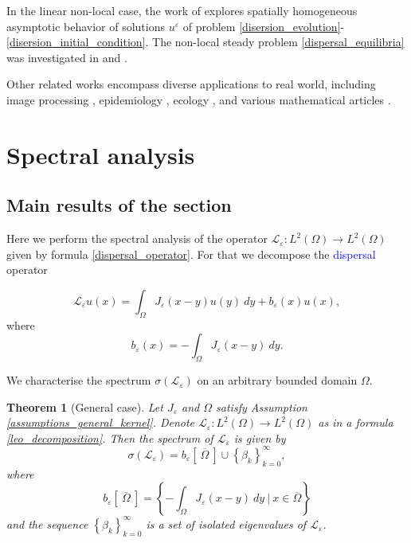 \documentclass[12pt, a4paper]{article}
\theoremstyle{break}
\newtheorem{thm}{Theorem}[section]
\theoremstyle{break}
\theoremstyle{break}
\theoremstyle{break}
\theoremstyle{break}
\newcommand{\Leo}{\mathcal{L}_{\varepsilon}}
\newcommand{\Seq}[2]{\left\{#1_#2\right\}_{#2 = 0}^\infty}
\newcommand{\Leb}{L^2\left(\Omega\right)}
\begin{document}
In the linear non-local case, the work of \cite{ChasseigneChavesRossi2006} explores spatially homogeneous asymptotic behavior of solutions $u^\varepsilon$ of problem \eqref{disersion_evolution}-\eqref{disersion_initial_condition}. The non-local steady problem \eqref{dispersal_equilibria} was investigated in \cite{ChasseigneChavesRossi2006} and \cite{Coville2010}. 

Other related works encompass diverse applications to real world, including image processing \cite{GilboaOsher2007, GilboaOsher2009}, epidemiology \cite{Yang2019}, ecology \cite{Hadeler1999}, and various mathematical articles \cite{Biler2019, SlevinskyMontanelli2018, Sun2023, Sun2022}.

\section{Spectral analysis} \label{sec:spectral_analysis}

\subsection{Main results of the section}

Here we perform the spectral analysis of the operator $\Leo: L^2(\Omega) \rightarrow L^2(\Omega)$ given by formula \eqref{dispersal_operator}. For that we decompose the \textcolor{blue}{dispersal} operator

\begin{equation}
    \Leo u(x) = \int_\Omega J_\varepsilon(x-y) u(y)\:dy + b_\varepsilon(x)u(x),
    \label{leo_decomposition}
\end{equation}
where
\begin{equation}
    b_\varepsilon(x) = -\int_\Omega J_\varepsilon(x-y)\:dy. \label{b_epsilon}
\end{equation}

We characterise the spectrum $\sigma(\Leo)$ on an arbitrary bounded domain $\Omega$.

\begin{thm}[General case]
    Let $J_\varepsilon$ and $\Omega$ satisfy Assumption \ref{assumptions_general_kernel}. Denote $\Leo: \Leb \rightarrow \Leb$ as in a formula \eqref{leo_decomposition}. Then the spectrum of $\Leo$ is given by
    \begin{equation}
        \sigma(\Leo) = b_\varepsilon \left[\: \overline{\Omega} \:\right] \cup \Seq{\beta}{k},
        \label{EQ:spectrum_formula_general}
    \end{equation}
    where
    $$b_\varepsilon\left[\: \overline{\Omega} \:\right] = \left\{ - \int_\Omega J_\varepsilon(x-y) \:dy \:\Big|\: x \in \overline{\Omega }\right\}$$
    and the sequence $\Seq{\beta}{k}$ is a set of isolated eigenvalues of $\Leo$. \label{thm:dispersal_spectrum}
\end{thm}
\end{document}
